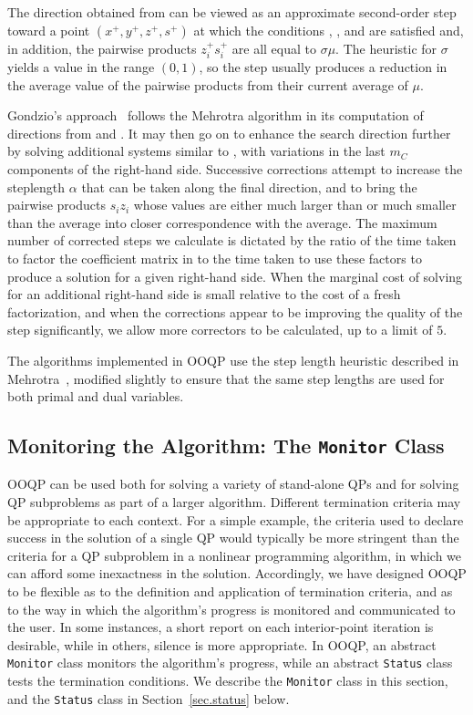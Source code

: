 The direction obtained from  can be viewed as an
approximate second-order step toward a point $(x^+,y^+,z^+,s^+)$ at
which the conditions , , and
 are satisfied and, in addition, the pairwise products
$z_i^+ s_i^+$ are all equal to $\sigma \mu$. The heuristic for
$\sigma$ yields a value in the range $(0,1)$, so the step usually
produces a reduction in the average value of the pairwise products
from their current average of $\mu$.

Gondzio's approach~\cite{Gon94d} follows the Mehrotra algorithm in its
computation of directions from  and
. It may then go on to enhance the search direction
further by solving additional systems similar to ,
with variations in the last $m_C$ components of the right-hand side.
Successive corrections attempt to increase the steplength $\alpha$
that can be taken along the final direction, and to bring the pairwise
products $s_i z_i$ whose values are either much larger than or much
smaller than the average into closer correspondence with the
average. The maximum number of corrected steps we calculate is
dictated by the ratio of the time taken to factor the coefficient
matrix in  to the time taken to use these factors to
produce a solution for a given right-hand side. When the marginal cost
of solving for an additional right-hand side is small relative to the
cost of a fresh factorization, and when the corrections appear to be
improving the quality of the step significantly, we allow more
correctors to be calculated, up to a limit of $5$.

The algorithms implemented in OOQP use the step length heuristic
described in Mehrotra~\cite[Section~6]{Meh92a}, modified slightly to
ensure that the same step lengths are used for both primal and dual
variables.

\subsection{Monitoring the Algorithm: The {\tt Monitor} Class}
\label{sec.monitor}

OOQP can be used both for solving a variety of stand-alone QPs and for
solving QP subproblems as part of a larger algorithm.  Different
termination criteria may be appropriate to each context. For a simple
example, the criteria used to declare success in the solution of a
single QP would typically be more stringent than the criteria for a QP
subproblem in a nonlinear programming algorithm, in which we can
afford some inexactness in the solution.  Accordingly, we have
designed OOQP to be flexible as to the definition and application of
termination criteria, and as to the way in which the algorithm's
progress is monitored and communicated to the user. In some instances,
a short report on each interior-point iteration is desirable, while in
others, silence is more appropriate.  In OOQP, an abstract
\texttt{Monitor} class monitors the algorithm's progress, while an
abstract \texttt{Status} class tests the termination conditions. We
describe the \texttt{Monitor} class in this section, and the
\texttt{Status} class in Section~\ref{sec.status} below.

